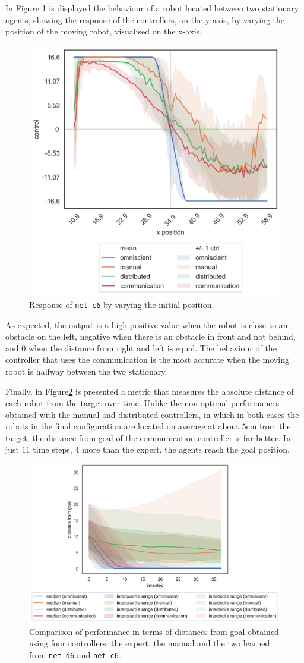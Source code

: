 In Figure \ref{fig:net-c6responseposition} is displayed the behaviour of a robot 
located between two stationary agents, showing the response of the controllers, 
on the y-axis, by varying the position of the moving robot, visualised on the 
x-axis.  
\begin{figure}[!htb]
	\centering
	\includegraphics[width=.45\textwidth]{contents/images/net-c6/response-varying_init_position-communication}%
	\caption{Response of \texttt{net-c6} by varying the initial position.}
	\label{fig:net-c6responseposition}
\end{figure}
As expected, the output is a high positive value when the robot is close to an 
obstacle on the left, negative when there is an obstacle in front and not behind, 
and $0$ when the distance from right and left is equal.
The behaviour of the controller that uses the communication is the most accurate 
when the moving robot is halfway between the two stationary.

Finally, in Figure\ref{fig:net-c6distance} is presented a metric that measures the 
absolute distance of each robot from the target over time.
Unlike the non-optimal performances obtained with the manual and distributed 
controllers, in which in both cases the robots in the final configuration are 
located on average at about $5$\gls{cm} from the target, the distance from goal 
of the communication controller is far better. In just $11$ time steps, $4$ more 
than the expert, the agents reach the goal position.
\begin{figure}[H]
	\centering
	\includegraphics[width=.65\textwidth]{contents/images/net-c6/distances-from-goal-compressed-communication}%
	\caption[Evaluation of \texttt{net-c6} distances from goal.]{Comparison of 
		performance in terms of distances from goal obtained using four controllers: 
		the expert, the manual and the two learned from \texttt{net-d6} and 
		\texttt{net-c6}.}
	\label{fig:net-c6distance}
\end{figure}

